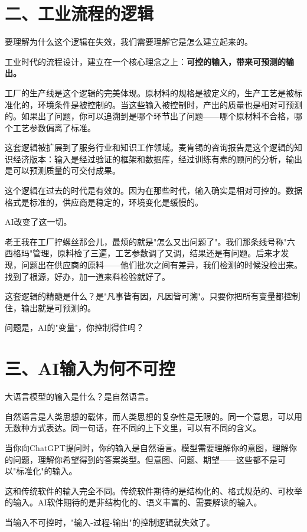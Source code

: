 \section{二、工业流程的逻辑}


要理解为什么这个逻辑在失效，我们需要理解它是怎么建立起来的。

工业时代的流程设计，建立在一个核心理念之上：\textbf{可控的输入，带来可预测的输出。}

工厂的生产线是这个逻辑的完美体现。原材料的规格是被定义的，生产工艺是被标准化的，环境条件是被控制的。当这些输入被控制时，产出的质量也是相对可预测的。如果出了问题，你可以追溯到是哪个环节出了问题——哪个原材料不合格，哪个工艺参数偏离了标准。

这套逻辑被扩展到了服务行业和知识工作领域。麦肯锡的咨询报告是这个逻辑的知识经济版本：输入是经过验证的框架和数据库，经过训练有素的顾问的分析，输出是可以预测质量的可交付成果。

这个逻辑在过去的时代是有效的。因为在那些时代，输入确实是相对可控的。数据格式是标准的，供应商是稳定的，环境变化是缓慢的。

AI改变了这一切。

老王我在工厂拧螺丝那会儿，最烦的就是"怎么又出问题了"。我们那条线号称"六西格玛"管理，原料检了三遍，工艺参数调了又调，结果还是有问题。后来才发现，问题出在供应商的原料——他们批次之间有差异，我们检测的时候没检出来。找到了根源，好办，加一道来料检验就好了。

这套逻辑的精髓是什么？是"凡事皆有因，凡因皆可溯"。只要你把所有变量都控制住，输出就是可预测的。

问题是，AI的"变量"，你控制得住吗？

\section{三、AI输入为何不可控}


大语言模型的输入是什么？是自然语言。

自然语言是人类思想的载体，而人类思想的复杂性是无限的。同一个意思，可以用无数种方式表达。同一句话，在不同的上下文里，可以有不同的含义。

当你向ChatGPT提问时，你的输入是自然语言。模型需要理解你的意图，理解你的问题，理解你希望得到的答案类型。但意图、问题、期望——这些都不是可以"标准化"的输入。

这和传统软件的输入完全不同。传统软件期待的是结构化的、格式规范的、可枚举的输入。AI软件期待的是非结构化的、语义丰富的、需要解读的输入。

当输入不可控时，"输入-过程-输出"的控制逻辑就失效了。

